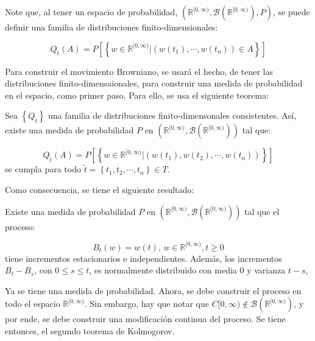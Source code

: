 Note que, al tener un espacio de probabilidad, $(\mathbb{R}^{[0, \infty)}, \mathcal{B}(\mathbb{R}^{[0, \infty)} ), P )$, se puede definir una familia de distribuciones finito-dimensionales:

\[
	Q_{\tilde{t}} (A) = P[ \left\{ w \in \mathbb{R}^{ [0,\infty) } \vert ( w(t_1), \cdots, w(t_n) ) \in A  \right\} ]
\]

Para construir el movimiento Browniano, se usará el hecho, de tener las distribuciones finito-dimensaionales, para construir una medida de probabilidad en el espacio, como primer paso. Para ello, se usa el siguiente teorema:


\begin{theorem}
	Sea $\left\{ Q_{ \tilde{t} } \right\}$ una familia de distribuciones finito-dimensonales consistentes. Así, existe una medida de probabilidad $P$ en $(\mathbb{R}^{ [0, \infty) }, \mathcal{B}(\mathbb{R}^{ [0, \infty) })  )$ tal que:

	\[
		Q_{\tilde{t}} (A) = P[ \left\{ w \in \mathbb{R}^{ [0,\infty) } | (w(t_1), w(t_2), \cdots, w(t_n)) \right\} ]
	\] 	
	se cumpla para todo $\tilde{t} = \left\{ t_1, t_2, \cdots, t_n \right\} \in T$.
\end{theorem}

Como consecuencia, se tiene el siguiente resultado:

\begin{coro}
	Existe una medida de probabilidad $P$ en $(\mathbb{R}^{ [0, \infty) }, \mathcal{B}(\mathbb{R}^{ [0, \infty) })  )$ tal que el proceso: 

	\[
		B_t (w) = w(t) \text{, } w \in \mathbb{R}^{[0, \infty)}, t \geq 0	
	\]
	tiene incrementos estacionarios e independientes. Además, los incrementos $B_t - B_s$, con $0 \leq s \leq t$, es normalmente distribuido con media $0$ y varianza $t - s$,

\end{coro}

Ya se tiene una medida de probabilidad. Ahora, se debe construir el proceso en todo el espacio $\mathbb{R}^{[0, \infty)}$. Sin embargo, hay que notar que $C[0, \infty) \notin \mathcal{B}( \mathbb{R}^{ [0, \infty) } )$, y por ende, se debe construir una modificación continua del proceso. Se tiene entonces, el segundo teorema de Kolmogorov.

